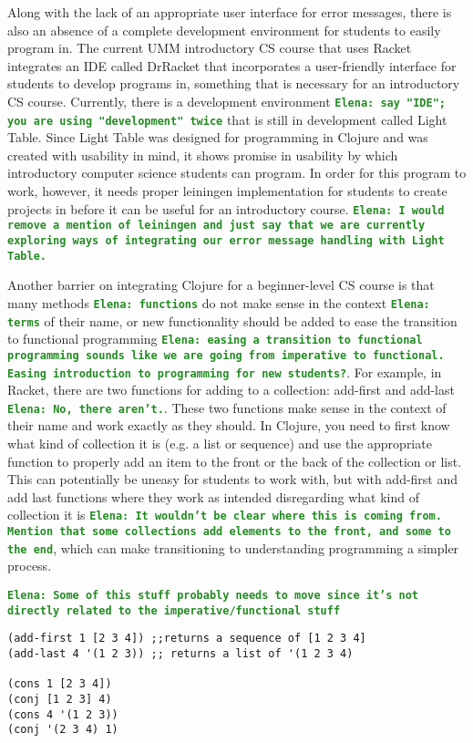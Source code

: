 \documentclass[12pt]{article}
\newcommand{\comment}[1]{{\bf \tt  {#1}}}
\newcommand{\emcomment}[1]{\textcolor{ForestGreen}{\comment{Elena: {#1}}}}
\begin{document}
Along with the lack of an appropriate user interface for error messages, there is also an absence of a complete development environment for students to easily program in. The current UMM introductory CS course that uses Racket integrates an IDE called DrRacket that incorporates a user-friendly interface for students to develop programs in, something that is necessary for an introductory CS course.  Currently, there is a development environment \emcomment{say "IDE"; you are using "development" twice} that is still in development called Light Table.  Since Light Table was designed for programming in Clojure and was created with usability in mind, it shows promise in usability by which introductory computer science students can program. In order for this program to work, however, it needs proper leiningen implementation for students to create projects in before it can be useful for an introductory course. \emcomment{I would remove a mention of leiningen and just say that we are currently exploring ways of integrating our error message handling with Light Table.}

Another barrier on integrating Clojure for a beginner-level CS course is that many methods \emcomment{functions} do not make sense in the context \emcomment{terms} of their name, or new functionality should be added to ease the transition to functional programming \emcomment{easing a transition to functional programming sounds like we are going from imperative to functional. Easing introduction to programming for new students?}.  For example, in Racket, there are two functions for adding to a collection: add-first and add-last \emcomment{No, there aren't.}. These two functions make sense in the context of their name and work exactly as they should. In Clojure, you need to first know what kind of collection it is (e.g. a list or sequence) and use the appropriate function to properly add an item to the front or the back of the collection or list. This can potentially be uneasy for students to work with, but with add-first and add last functions where they work as intended disregarding what kind of collection it is \emcomment{It wouldn't be clear where this is coming from. Mention that some collections add elements to the front, and some to the end}, which can make transitioning to understanding programming a simpler process.

\emcomment{Some of this stuff probably needs to move since it's not directly related to the imperative/functional stuff}

\begin{verbatim}         
(add-first 1 [2 3 4]) ;;returns a sequence of [1 2 3 4]
(add-last 4 '(1 2 3)) ;; returns a list of '(1 2 3 4)

(cons 1 [2 3 4])
(conj [1 2 3] 4)
(cons 4 '(1 2 3))
(conj '(2 3 4) 1)
\end{verbatim}
\end{document}
